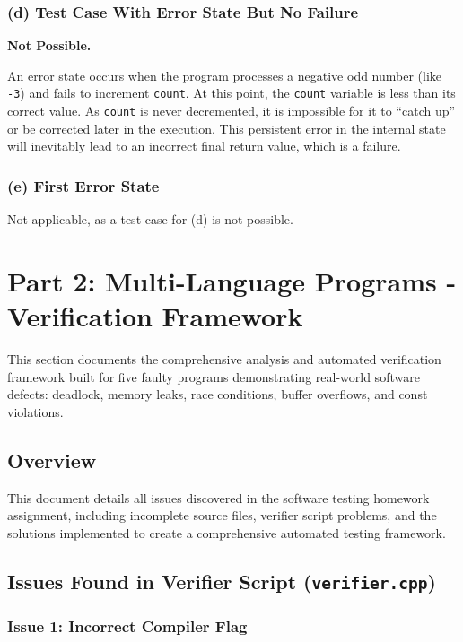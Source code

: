 \documentclass[11pt,a4paper]{article}
\begin{document}
\subsubsection{(d) Test Case With Error State But No Failure}

\textbf{Not Possible.}

 An error state occurs when the program processes a negative odd number (like \texttt{-3}) and fails to increment \texttt{count}. At this point, the \texttt{count} variable is less than its correct value. As \texttt{count} is never decremented, it is impossible for it to ``catch up'' or be corrected later in the execution. This persistent error in the internal state will inevitably lead to an incorrect final return value, which is a failure.

\subsubsection{(e) First Error State}

Not applicable, as a test case for (d) is not possible.

\newpage
\section{Part 2: Multi-Language Programs - Verification Framework}

This section documents the comprehensive analysis and automated verification framework built for five faulty programs demonstrating real-world software defects: deadlock, memory leaks, race conditions, buffer overflows, and const violations.

\subsection{Overview}

This document details all issues discovered in the software testing homework assignment, including incomplete source files, verifier script problems, and the solutions implemented to create a comprehensive automated testing framework.

\subsection{Issues Found in Verifier Script (\texttt{verifier.cpp})}

\subsubsection{Issue 1: Incorrect Compiler Flag}
\end{document}
